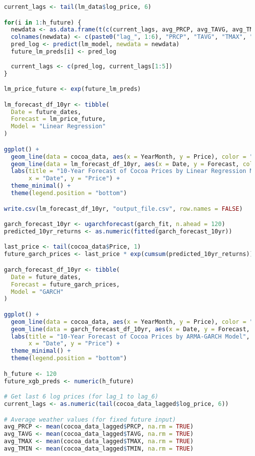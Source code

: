 \documentclass[10pt]{article}
\begin{document}
\begin{lstlisting}[language=R, caption=Forecast]
current_lags <- tail(lm_data$log_price, 6)

for(i in 1:h_future) {
  newdata <- as.data.frame(t(c(current_lags, avg_PRCP, avg_TAVG, avg_TMAX, avg_TMIN)))
  colnames(newdata) <- c(paste0("lag_", 1:6), "PRCP", "TAVG", "TMAX", "TMIN")
  pred_log <- predict(lm_model, newdata = newdata)
  future_lm_preds[i] <- pred_log
  
  current_lags <- c(pred_log, current_lags[1:5])
}

lm_price_future <- exp(future_lm_preds)

lm_forecast_df_10yr <- tibble(
  Date = future_dates,
  Forecast = lm_price_future,
  Model = "Linear Regression"
)

ggplot() +
  geom_line(data = cocoa_data, aes(x = YearMonth, y = Price), color = "black", linewidth = 1.2) +
  geom_line(data = lm_forecast_df_10yr, aes(x = Date, y = Forecast, color = Model, linetype = Model), linewidth = 1.2) +
  labs(title = "10-Year Forecast of Cocoa Prices by Linear Regression Model",
       x = "Date", y = "Price") +
  theme_minimal() +
  theme(legend.position = "bottom")

write.csv(lm_forecast_df_10yr, "output_file.csv", row.names = FALSE)

garch_forecast_10yr <- ugarchforecast(garch_fit, n.ahead = 120)
predicted_10yr_returns <- as.numeric(fitted(garch_forecast_10yr))

last_price <- tail(cocoa_data$Price, 1)
future_garch_prices <- last_price * exp(cumsum(predicted_10yr_returns))

garch_forecast_df_10yr <- tibble(
  Date = future_dates,
  Forecast = future_garch_prices,
  Model = "GARCH"
)

ggplot() +
  geom_line(data = cocoa_data, aes(x = YearMonth, y = Price), color = "black", linewidth = 1.2) +
  geom_line(data = garch_forecast_df_10yr, aes(x = Date, y = Forecast, color = Model, linetype = Model), linewidth = 1.2) +
  labs(title = "10-Year Forecast of Cocoa Prices by ARMA-GARCH Model",
       x = "Date", y = "Price") +
  theme_minimal() +
  theme(legend.position = "bottom")

h_future <- 120
future_xgb_preds <- numeric(h_future)

# Get last 6 log prices (for lag_1 to lag_6)
current_lags <- as.numeric(tail(cocoa_data_lagged$log_price, 6))

# Average weather values (for fixed future input)
avg_PRCP <- mean(cocoa_data_lagged$PRCP, na.rm = TRUE)
avg_TAVG <- mean(cocoa_data_lagged$TAVG, na.rm = TRUE)
avg_TMAX <- mean(cocoa_data_lagged$TMAX, na.rm = TRUE)
avg_TMIN <- mean(cocoa_data_lagged$TMIN, na.rm = TRUE)


\end{lstlisting}
\end{document}
